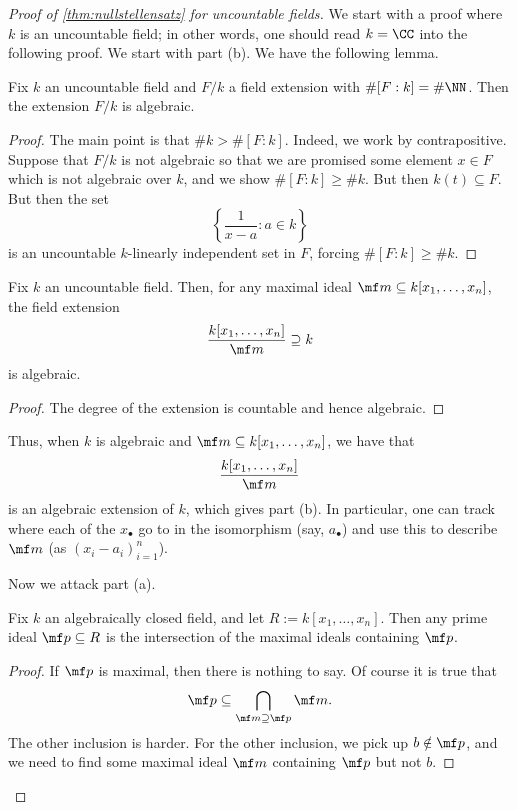 \begin{proof}[Proof of \autoref{thm:nullstellensatz} for uncountable fields]
	We start with a proof where $k$ is an uncountable field; in other words, one should read $k=\CC$ into the following proof. We start with part (b). We have the following lemma.
	\begin{lemma}
		Fix $k$ an uncountable field and $F/k$ a field extension with $\#[F:k]=\#\NN$. Then the extension $F/k$ is algebraic.
	\end{lemma}
	\begin{proof}
		The main point is that $\#k>\#[F:k]$. Indeed, we work by contrapositive. Suppose that $F/k$ is not algebraic so that we are promised some element $x\in F$ which is not algebraic over $k$, and we show $\#[F:k]\ge\#k$. But then $k(t)\subseteq F$. But then the set
		\[\left\{\frac1{x-a}:a\in k\right\}\]
		is an uncountable $k$-linearly independent set in $F$, forcing $\#[F:k]\ge\#k$.
	\end{proof}
	\begin{corollary}
		Fix $k$ an uncountable field. Then, for any maximal ideal $\mf m\subseteq k[x_1,\ldots,x_n]$, the field extension
		\[\frac{k[x_1,\ldots,x_n]}{\mf m}\supseteq k\]
		is algebraic.
	\end{corollary}
	\begin{proof}
		The degree of the extension is countable and hence algebraic.
	\end{proof}
	Thus, when $k$ is algebraic and $\mf m\subseteq k[x_1,\ldots,x_n]$, we have that
	\[\frac{k[x_1,\ldots,x_n]}{\mf m}\]
	is an algebraic extension of $k$, which gives part (b). In particular, one can track where each of the $x_\bullet$ go to in the isomorphism (say, $a_\bullet$) and use this to describe $\mf m$ (as $(x_i-a_i)_{i=1}^n$).

	Now we attack part (a).
	\begin{lemma} \label{lem:betterjacobson}
		Fix $k$ an algebraically closed field, and let $R:=k[x_1,\ldots,x_n]$. Then any prime ideal $\mf p\subseteq R$ is the intersection of the maximal ideals containing $\mf p$.
	\end{lemma}
	\begin{proof}
		If $\mf p$ is maximal, then there is nothing to say. Of course it is true that
		\[\mf p\subseteq\bigcap_{\mf m\supseteq\mf p}\mf m.\]
		The other inclusion is harder. For the other inclusion, we pick up $b\notin\mf p$, and we need to find some maximal ideal $\mf m$ containing $\mf p$ but not $b$.


\end{proof}
\end{proof}
